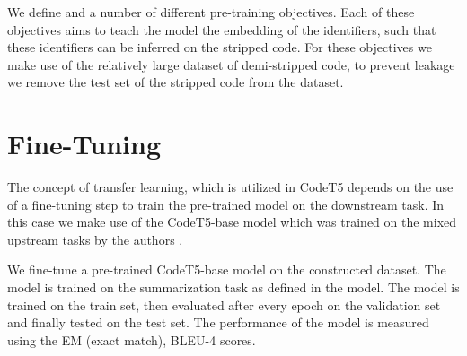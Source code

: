 We define and a number of different pre-training objectives. Each of these objectives aims to teach the model the embedding of the identifiers, such that these identifiers can be inferred on the stripped code. For these objectives we make use of the relatively large dataset of demi-stripped code, to prevent leakage we remove the test set of the stripped code from the dataset.

\section{Fine-Tuning}
The concept of transfer learning, which is utilized in CodeT5 depends on the use of a fine-tuning step to train the pre-trained model on the downstream task. In this case we make use of the CodeT5-base model which was trained on the mixed upstream tasks by the authors \cite{CodeT5}.

We fine-tune a pre-trained CodeT5-base model on the constructed dataset. The model is trained on the summarization task as defined in the model. The model is trained on the train set, then evaluated after every epoch on the validation set and finally tested on the test set. The performance of the model is measured using the EM (exact match), BLEU-4 scores.